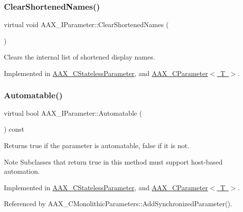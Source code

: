 \subsubsection{\texorpdfstring{ClearShortenedNames()}{ClearShortenedNames()}}
{\footnotesize\ttfamily virtual void A\+A\+X\+\_\+\+I\+Parameter\+::\+Clear\+Shortened\+Names (\begin{DoxyParamCaption}{ }\end{DoxyParamCaption})\hspace{0.3cm}{\ttfamily [pure virtual]}}



Clears the internal list of shortened display names. 



Implemented in \mbox{\hyperlink{a01541_a1a3829b633e0eeb8771d2cacc9b1ac70}{A\+A\+X\+\_\+\+C\+Stateless\+Parameter}}, and \mbox{\hyperlink{a01537_aaf64cb6bcfb239dc3d60539bc84aca9d}{A\+A\+X\+\_\+\+C\+Parameter$<$ T $>$}}.

\mbox{\label{a01857_a253ff336b79cfb454f07d4fa21f2884f}} 
\subsubsection{\texorpdfstring{Automatable()}{Automatable()}}
{\footnotesize\ttfamily virtual bool A\+A\+X\+\_\+\+I\+Parameter\+::\+Automatable (\begin{DoxyParamCaption}{ }\end{DoxyParamCaption}) const\hspace{0.3cm}{\ttfamily [pure virtual]}}



Returns true if the parameter is automatable, false if it is not. 

\begin{DoxyNote}{Note}
Subclasses that return true in this method must support host-\/based automation. 
\end{DoxyNote}


Implemented in \mbox{\hyperlink{a01541_a94d8ff19d89cd2d2024f45f7763abfab}{A\+A\+X\+\_\+\+C\+Stateless\+Parameter}}, and \mbox{\hyperlink{a01537_aebb304bbabf739d5019bd6372e8928d7}{A\+A\+X\+\_\+\+C\+Parameter$<$ T $>$}}.



Referenced by A\+A\+X\+\_\+\+C\+Monolithic\+Parameters\+::\+Add\+Synchronized\+Parameter().

